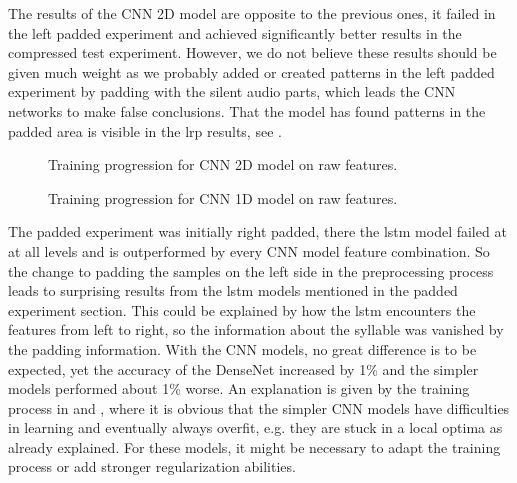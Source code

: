 The results of the CNN 2D model are opposite to the previous ones, it failed in the left padded experiment and achieved significantly better results in the compressed test experiment. However, we do not believe these results should be given much weight as we probably added or created patterns in the left padded experiment by padding with the silent audio parts, which leads the CNN networks to make false conclusions. That the model has found patterns in the padded area is visible in the \gls{lrp} results, see .

\begin{figure}[ht!]
\centering
  \hfill
  \caption{Training progression for CNN 2D model \cite{nn_cnn_2d_sct_left_padded_nrs6xpps5000h512_raw_100} on raw features.}
  \label{fig:train_val_cnn_2d_sct_left_padded_nrs6xpps5000h512_raw_100}
\end{figure}

\begin{figure}[ht!]
\centering
  \hfill
  \caption{Training progression for CNN 1D model \cite{nn_cnn_1d_sct_left_padded_nrs0xpps5000h512_raw_100} on raw features.}
  \label{fig:train_val_cnn_1d_sct_left_padded_nrs0xpps5000h512_raw_100}
\end{figure}

The padded experiment was initially right padded, there the \gls{lstm} model failed at at all levels and is outperformed by every CNN model feature combination.
So the change to padding the samples on the left side in the preprocessing process leads to surprising results from the \gls{lstm} models mentioned in the padded experiment section.
This could be explained by how the \gls{lstm} encounters the features from left to right, so the information about the syllable was vanished by the padding information.
With the CNN models, no great difference is to be expected, yet the accuracy of the DenseNet increased by 1\% and the simpler models performed about 1\% worse.
An explanation is given by the training process in  and , where it is obvious that the simpler CNN models have difficulties in learning and eventually always overfit, e.g. they are stuck in a local optima as already explained.
For these models, it might be necessary to adapt the training process or add stronger regularization abilities.

